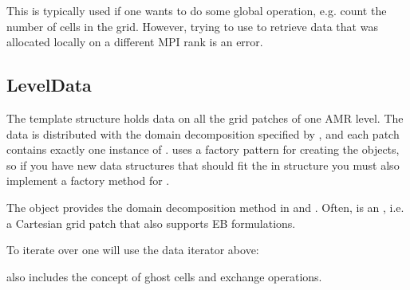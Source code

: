 \documentclass[letterpaper,10pt,english]{sphinxmanual}
\begin{document}
This is typically used if one wants to do some global operation, e.g. count the number of cells in the grid.
However, trying to use  to retrieve data that was allocated locally on a different MPI rank is an error.


\subsection{LevelData}
\label{\detokenize{Source/ChomboBasics:leveldata}}
The  template structure holds data on all the grid patches of one AMR level.
The data is distributed with the domain decomposition specified by , and each patch contains exactly one instance of .
 uses a factory pattern for creating the  objects, so if you have new data structures that should fit the in  structure you must also implement a factory method for .

The  object provides the domain decomposition method in  and .
Often,  is an , i.e. a Cartesian grid patch that also supports EB formulations.

To iterate over  one will use the data iterator above:

\begin{sphinxVerbatim}[commandchars=\\\{\},formatcom=\scriptsize]
 
    
     \PYG{p}{[}\PYG{p}{]}
\end{sphinxVerbatim}

 also includes the concept of ghost cells and exchange operations.
\end{document}
